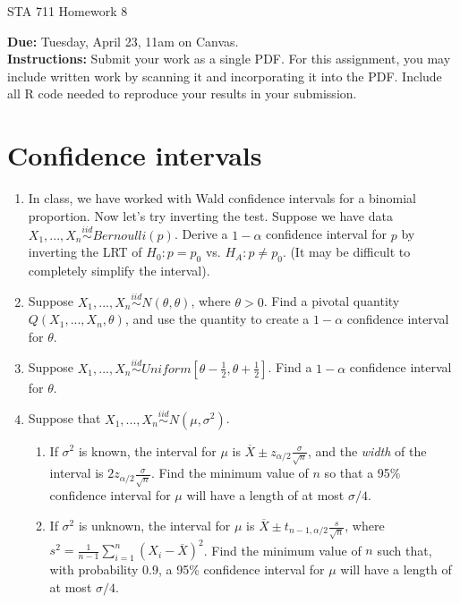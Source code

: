 \documentclass[11pt]{article}
\begin{document}
\begin{center}
\Large
STA 711 Homework 8\\
\normalsize
\vspace{5mm}
\end{center}

\noindent \textbf{Due:} Tuesday, April 23, 11am on Canvas.\\ 

\noindent \textbf{Instructions:} Submit your work as a single PDF. For this assignment, you may include written work by scanning it and incorporating it into the PDF. Include all R code needed to reproduce your results in your submission.

\section*{Confidence intervals}


\begin{enumerate}
\item In class, we have worked with Wald confidence intervals for a binomial proportion. Now let's try inverting the test. Suppose we have data $X_1,...,X_n \overset{iid}{\sim} Bernoulli(p)$. Derive a $1 - \alpha$ confidence interval for $p$ by inverting the LRT of $H_0: p = p_0$ vs. $H_A: p \neq p_0$. (It may be difficult to completely simplify the interval).

\item Suppose $X_1,...,X_n \overset{iid}{\sim} N(\theta, \theta)$, where $\theta > 0$. Find a pivotal quantity $Q(X_1,...,X_n, \theta)$, and use the quantity to create a $1 - \alpha$ confidence interval for $\theta$.

\item Suppose $X_1,...,X_n \overset{iid}{\sim} Uniform[\theta - \frac{1}{2}, \theta + \frac{1}{2}]$. Find a $1 - \alpha$ confidence interval for $\theta$.

\item Suppose that $X_1,...,X_n \overset{iid}{\sim} N(\mu, \sigma^2)$. 

\begin{enumerate}
\item If $\sigma^2$ is known, the interval for $\mu$ is $\overline{X} \pm z_{\alpha/2} \frac{\sigma}{\sqrt{n}}$, and the \textit{width} of the interval is $2z_{\alpha/2} \frac{\sigma}{\sqrt{n}}$. Find the minimum value of $n$ so that a 95\% confidence interval for $\mu$ will have a length of at most $\sigma/4$.

\item If $\sigma^2$ is unknown, the interval for $\mu$ is $\overline{X} \pm t_{n-1, \alpha/2} \frac{s}{\sqrt{n}}$, where $s^2 = \frac{1}{n-1} \sum \limits_{i=1}^n (X_i - \overline{X})^2$. Find the minimum value of $n$ such that, with probability 0.9, a 95\% confidence interval for $\mu$ will have a length of at most $\sigma/4$.
\end{enumerate}

\end{enumerate}
\end{document}
